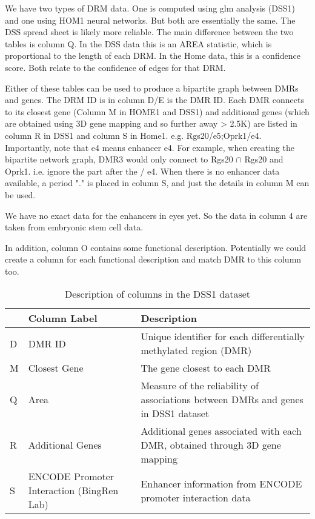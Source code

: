 \documentclass{article}
\begin{document}
We have two types of DRM data. One is computed using glm analysis (DSS1) and one using HOM1 neural networks. But both are essentially the same. The DSS spread sheet is likely more reliable. The main difference between the two tables is column Q. In the DSS data this is an AREA statistic, which is proportional to the length of each DRM. In the Home data, this is a confidence score. Both relate to the confidence of edges for that DRM.

Either of these tables can be used to produce a bipartite graph between DMRs and genes.
The DRM ID is in column D/E is the DMR ID. Each DMR connects to its closest gene (Column M in HOME1 and DSS1) and additional genes (which are obtained using 3D gene mapping and so further away > 2.5K) are listed in column R in DSS1 and column S in Home1. e.g. Rgs20/e5;Oprk1/e4. Importantly, note that e4 means enhancer e4. For example, when creating the bipartite network graph, DMR3 would only connect to Rgs20 $\cap$ Rgs20 and Oprk1. i.e. ignore the part after the / e4. When there is no enhancer data available, a period "." is placed in column S, and just the details in column M can be used.

We have no exact data for the enhancers in eyes yet. So the data in column 4 are taken from embryonic stem cell data.

In addition, column O contains some functional description. Potentially we could create a column for each functional description and match DMR to this column too.

\begin{table*}[h]
\centering
\sffamily
\setlength{\tabcolsep}{5pt}
\begin{tabular}
{@{}p{0.6cm}p{3.0cm}p{7.5cm}@{}}
\toprule
& \bf{Column Label} & \bf{Description} \\
\midrule
D & DMR ID & Unique identifier for each differentially methylated region (DMR) \\
M & Closest Gene & The gene closest to each DMR \\
Q & Area & Measure of the reliability of associations between DMRs and genes in DSS1 dataset \\
R & Additional Genes & Additional genes associated with each DMR, obtained through 3D gene mapping \\
S & ENCODE Promoter Interaction (BingRen Lab) & Enhancer information from ENCODE promoter interaction data \\
\bottomrule
\end{tabular}
\caption{Description of columns in the DSS1 dataset}
\label{table:dss1_columns}
\end{table*}
\end{document}
